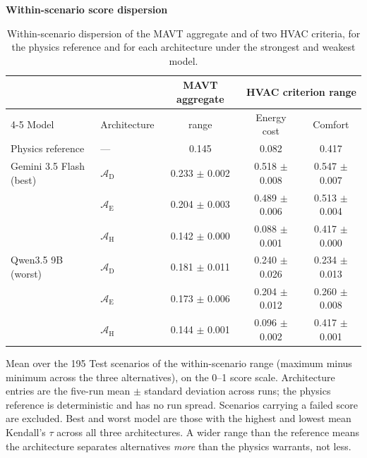\begin{table}[htbp]
\begin{threeparttable}
  \footnotesize
  \centering
  \textbf{Within-scenario score dispersion}
  \begin{tabular}{llccc}
    \toprule
    & & MAVT aggregate & \multicolumn{2}{c}{HVAC criterion range} \\
    \cmidrule(lr){4-5}
    Model & Architecture & range & Energy cost & Comfort \\
    \midrule
    Physics reference & --- & 0.145 & 0.082 & 0.417 \\
    \midrule
    Gemini 3.5 Flash (best) & $\mathcal{A}_{\text{D}}$ & 0.233 $\pm$ 0.002 & 0.518 $\pm$ 0.008 & 0.547 $\pm$ 0.007 \\
     & $\mathcal{A}_{\text{E}}$ & 0.204 $\pm$ 0.003 & 0.489 $\pm$ 0.006 & 0.513 $\pm$ 0.004 \\
     & $\mathcal{A}_{\text{H}}$ & 0.142 $\pm$ 0.000 & 0.088 $\pm$ 0.001 & 0.417 $\pm$ 0.000 \\
    \addlinespace
    Qwen3.5 9B (worst) & $\mathcal{A}_{\text{D}}$ & 0.181 $\pm$ 0.011 & 0.240 $\pm$ 0.026 & 0.234 $\pm$ 0.013 \\
     & $\mathcal{A}_{\text{E}}$ & 0.173 $\pm$ 0.006 & 0.204 $\pm$ 0.012 & 0.260 $\pm$ 0.008 \\
     & $\mathcal{A}_{\text{H}}$ & 0.144 $\pm$ 0.001 & 0.096 $\pm$ 0.002 & 0.417 $\pm$ 0.001 \\
    \bottomrule
  \end{tabular}
  \begin{tablenotes}
    \item Mean over the 195 Test scenarios of the within-scenario range (maximum minus minimum across the three alternatives), on the 0--1 score scale. Architecture entries are the five-run mean $\pm$ standard deviation across runs; the physics reference is deterministic and has no run spread. Scenarios carrying a failed score are excluded. Best and worst model are those with the highest and lowest mean Kendall's $\tau$ across all three architectures. A wider range than the reference means the architecture separates alternatives \emph{more} than the physics warrants, not less.
  \end{tablenotes}
\end{threeparttable}
\caption{Within-scenario dispersion of the MAVT aggregate and of two HVAC criteria, for the physics reference and for each architecture under the strongest and weakest model.}
\label{tab:dispersion}
\end{table}
